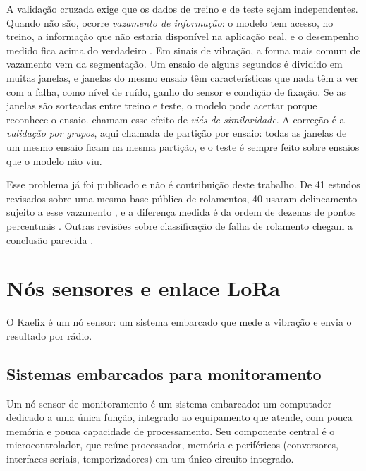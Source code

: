 A validação cruzada exige que os dados de treino e de teste sejam independentes. Quando não são, ocorre \emph{vazamento de informação}: o modelo tem acesso, no treino, a informação que não estaria
disponível na aplicação real, e o desempenho medido fica acima do verdadeiro \cite{kaufman2012}. Em sinais de vibração, a forma mais comum de vazamento vem da segmentação. Um ensaio de alguns
segundos é dividido em muitas janelas, e janelas do mesmo ensaio têm características que nada têm a ver com a falha, como nível de ruído, ganho do sensor e condição de fixação. Se as janelas são
sorteadas entre treino e teste, o modelo pode acertar porque reconhece o ensaio.  chamam esse efeito de \emph{viés de similaridade}. A correção é a \emph{validação por
grupos}, aqui chamada de partição por ensaio: todas as janelas de um mesmo ensaio ficam na mesma partição, e o teste é sempre feito sobre ensaios que o modelo não viu.

Esse problema já foi publicado e não é contribuição deste trabalho. De \num{41} estudos revisados sobre uma mesma base pública de rolamentos, \num{40} usaram delineamento sujeito a esse vazamento
\cite{varejao2025}, e a diferença medida é da ordem de dezenas de pontos percentuais \cite{vieira2026}. Outras revisões sobre classificação de falha de rolamento chegam a conclusão parecida
\cite{abburi2023,smith2015}.

\section{Nós sensores e enlace LoRa}
\label{sec:fund-no}

O Kaelix é um nó sensor: um sistema embarcado que mede a vibração e envia o resultado por rádio.

\subsection{Sistemas embarcados para monitoramento}
\label{sec:fund-embarcados}

Um nó sensor de monitoramento é um sistema embarcado: um computador dedicado a uma única função, integrado ao equipamento que atende, com pouca memória e pouca capacidade de processamento. Seu
componente central é o microcontrolador, que reúne processador, memória e periféricos (conversores, interfaces seriais, temporizadores) em um único circuito integrado.

